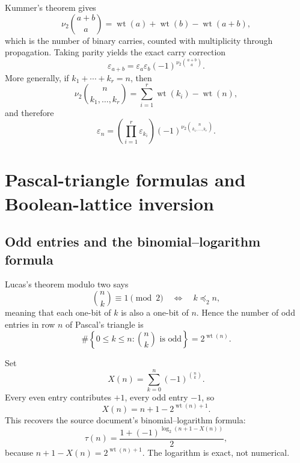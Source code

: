 \documentclass[11pt,oneside]{article}
\numberwithin{equation}{section}
\theoremstyle{definition}
\theoremstyle{remark}
\newcommand{\wt}{\operatorname{wt}}
\newcommand{\vtwo}{\nu_2}
\newcommand{\eps}{\varepsilon}
\newcommand{\TM}{\tau}
\newcommand{\submask}{\preceq_2}
\begin{document}
Kummer's theorem gives
\begin{equation}
 \vtwo\binom{a+b}{a}=\wt(a)+\wt(b)-\wt(a+b),
 \label{eq:kummer-two}
\end{equation}
which is the number of binary carries, counted with multiplicity through
propagation.  Taking parity yields the exact carry correction
\begin{equation}
 \boxed{\eps_{a+b}=\eps_a\eps_b
 (-1)^{\vtwo\binom{a+b}{a}}.}
 \label{eq:carry-correction}
\end{equation}
More generally, if \(k_1+\cdots+k_r=n\), then
\begin{equation}
 \vtwo\binom{n}{k_1,\ldots,k_r}
 =\sum_{i=1}^r\wt(k_i)-\wt(n),
 \label{eq:multinomial-valuation}
\end{equation}
and therefore
\begin{equation}
 \boxed{\eps_n=
  \left(\prod_{i=1}^r\eps_{k_i}\right)
  (-1)^{\vtwo\binom{n}{k_1,\ldots,k_r}}.}
 \label{eq:multinomial-sign}
\end{equation}

\section{Pascal-triangle formulas and Boolean-lattice inversion}
\label{sec:pascal}

\subsection{Odd entries and the binomial--logarithm formula}

Lucas's theorem modulo two says
\begin{equation}
 \binom nk\equiv1\pmod2
 \quad\Longleftrightarrow\quad k\submask n,
 \label{eq:lucas-submask}
\end{equation}
meaning that each one-bit of \(k\) is also a one-bit of \(n\).  Hence the
number of odd entries in row \(n\) of Pascal's triangle is
\begin{equation}
 \boxed{\#\left\{0\le k\le n:\binom nk\text{ is odd}\right\}
 =2^{\wt(n)}.}
 \label{eq:odd-row-count}
\end{equation}

Set
\begin{equation}
 X(n)=\sum_{k=0}^n(-1)^{\binom nk}.
 \label{eq:X-def}
\end{equation}
Every even entry contributes \(+1\), every odd entry \(-1\), so
\begin{equation}
 \boxed{X(n)=n+1-2^{\wt(n)+1}.}
 \label{eq:X-exact}
\end{equation}
This recovers the source document's binomial--logarithm formula:
\begin{equation}
 \TM(n)=\frac{1+(-1)^{\log_2(n+1-X(n))}}2,
 \label{eq:binomial-log}
\end{equation}
because \(n+1-X(n)=2^{\wt(n)+1}\).  The logarithm is exact, not numerical.
\end{document}
